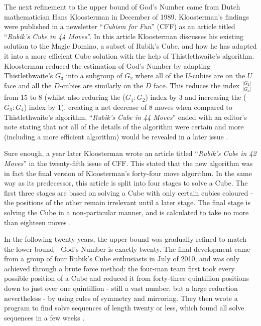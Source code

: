 \documentclass{report}
\newcommand{\tit}[1]{\textit{#1}}
\newcommand{\propernoun}[1]{\enquote{\tit{#1}}}
\begin{document}
    The next refinement to the upper bound of God's Number came from Dutch mathematician Hans Kloosterman in December of 1989. Kloosterman's findings were published in a newsletter \propernoun{Cubism for Fun} (CFF) as an article titled \propernoun{Rubik's Cube in 44 Moves}. In this article Kloosterman discusses his existing solution to the Magic Domino, a subset of Rubik's Cube, and how he has adapted it into a more efficient Cube solution with the help of Thistlethwaite's algorithm. Kloosterman reduced the estimation of God's Number by adapting Thistlethwaite's $G_3$ into a subgroup of $G_2$ where all of the $U$-cubies are on the $U$ face and all the $D$-cubies are similarly on the $D$ face. This reduces the index $\frac{|G_2|}{|G_3|}$ from 15 to 8 (whilst also reducing the ($G_1:G_2$) index by 3 and increasing the ($G_3:G_4$) index by 1), creating a net decrease of 8 moves when compared to Thistlethwaite's algorithm. \propernoun{Rubik's Cube in 44 Moves} ended with an editor's note stating that not all of the details of the algorithm were certain and more (including a more efficient algorithm) would be revealed in a later issue \cite{Kloosterman1989}.
    
    Sure enough, a year later Kloosterman wrote an article titled \propernoun{Rubik's Cube in 42 Moves} in the twenty-fifth issue of CFF. This stated that the new algorithm was in fact the final version of Kloosterman's forty-four move algorithm. In the same way as its predecessor, this article is split into four stages to solve a Cube. The first three stages are based on solving a Cube with only certain cubies coloured - the positions of the other remain irrelevant until a later stage. The final stage is solving the Cube in a non-particular manner, and is calculated to take no more than eighteen moves \cite{Kloosterman1990}.
    
    In the following twenty years, the upper bound was gradually refined to match the lower bound - God's Number is exactly twenty. The final development came from a group of four Rubik's Cube enthusiasts in July of 2010, and was only achieved through a brute force method: the four-man team first took every possible position of a Cube and reduced it from forty-three quintillion positions down to just over one quintillion - still a vast number, but a large reduction nevertheless - by using rules of symmetry and mirroring. They then wrote a program to find solve sequences of length twenty or less, which found all solve sequences in a few weeks \cite{Rokicki2010}.
    
\end{document}
